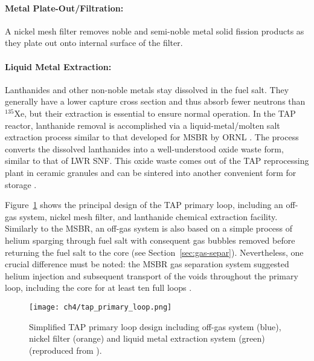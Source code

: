 \paragraph*{Metal Plate-Out/Filtration:} A nickel mesh filter removes noble 
and semi-noble metal solid fission products as they plate out onto internal 
surface of the filter.
\paragraph*{Liquid Metal Extraction:} Lanthanides and other non-noble metals 
stay dissolved in the fuel salt. They generally have a lower capture cross 
section and thus absorb fewer neutrons than $^{135}$Xe, but their extraction 
is essential to ensure normal operation. In the \gls{TAP} reactor, lanthanide 
removal is accomplished via a liquid-metal/molten salt extraction process 
similar to that developed for \gls{MSBR} by \gls{ORNL}  
\cite{robertson_conceptual_1971}. The process converts the dissolved 
lanthanides into a well-understood oxide waste form, similar to that of 
\gls{LWR} \gls{SNF}. This oxide waste comes out of the \gls{TAP} reprocessing 
plant in ceramic granules and can be sintered into another convenient form for 
storage \cite{transatomic_power_corporation_technical_2016}.

Figure~\ref{fig:tap-reproc} shows the principal design of the \gls{TAP} 
primary loop, including an off-gas system, nickel mesh filter, and lanthanide 
chemical extraction facility. Similarly to the \gls{MSBR}, an off-gas system 
is also based on a simple process of helium sparging through fuel salt with 
consequent gas bubbles removed before returning the fuel salt to the core (see 
Section~\ref{sec:gas-separ}). 
Nevertheless, one crucial difference must be noted: the \gls{MSBR} gas 
separation system suggested helium injection and subsequent transport of the 
voids throughout the primary loop, including the core for at least ten full 
loops \cite{robertson_conceptual_1971}. 
\begin{figure}[htp!] %
	\centering
	\texttt{[image: ch4/tap\_primary\_loop.png]}
	\caption{Simplified \gls{TAP} primary loop design including off-gas system 
		(blue), 
		nickel filter (orange) and liquid metal extraction system (green) 
		(reproduced from \cite{transatomic_power_transatomic_2019}).}
	\label{fig:tap-reproc}
\end{figure}

